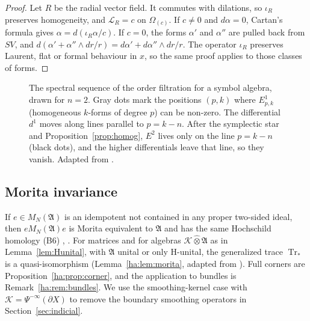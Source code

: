 \documentclass[11pt,oneside,reqno]{article}
\DeclareMathOperator{\Tr}{Tr}
\theoremstyle{plain}
\theoremstyle{definition}
\theoremstyle{remark}
\begin{document}
\begin{proof}
Let \(R\) be the radial vector field. It commutes with dilations, so
\(\iota_R\) preserves homogeneity, and \(\mathcal L_R=c\) on
\(\Omega_{(c)}\). If \(c\ne0\) and \(d\alpha=0\), Cartan's formula gives
\(\alpha=d(\iota_R\alpha/c)\). If \(c=0\), the forms \(\alpha'\) and
\(\alpha''\) are pulled back from \(SV\), and
\(d(\alpha'+\alpha''\wedge dr/r)=d\alpha'+d\alpha''\wedge dr/r\). The
operator \(\iota_R\) preserves Laurent, flat or formal behaviour in \(x\),
so the same proof applies to those classes of forms.
\end{proof}

\begin{figure}[htbp]
\centering
{}
\caption[The order spectral sequence]{The spectral sequence of the order
filtration for a symbol algebra, drawn for \(n=2\). Gray dots mark the
positions \((p,k)\) where \(E^1_{p,k}\) (homogeneous \(k\)-forms of degree
\(p\)) can be non-zero. The differential \(d^1\) moves along lines
parallel to \(p=k-n\). After the symplectic star and
Proposition~\ref{prop:homog}, \(E^2\) lives only on the line \(p=k-n\)
(black dots), and the higher differentials leave that line, so they vanish.
Adapted from \cite[Ch.~10]{MelroseMicro}.}
\label{fig:ss}
\end{figure}

\subsection{Morita invariance}\label{subsec:morita}
If \(e\in M_N(\mathfrak A)\) is an idempotent not contained in any proper
two-sided ideal, then \(eM_N(\mathfrak A)e\) is Morita equivalent to
\(\mathfrak A\) and has the same Hochschild homology (B6)
\cite[Prop.~13]{MN}, \cite{Loday}. For matrices and for algebras
\(\mathcal K\widehat\otimes\mathfrak A\) as in Lemma~\ref{lem:Hunital},
with \(\mathfrak A\) unital or only H-unital, the generalized trace
\(\Tr_*\) is a quasi-isomorphism (Lemma~\ref{ha:lem:morita}, adapted from
\cite[Lemma ``Morita invariance for smoothing kernels'']{HHb}). Full
corners are Proposition~\ref{ha:prop:corner}, and the application to
bundles is Remark~\ref{ha:rem:bundles}. We use the smoothing-kernel case with \(\mathcal K=\Psi^{-\infty}(
\partial X)\) to remove the boundary smoothing operators in
Section~\ref{sec:indicial}.
\end{document}
